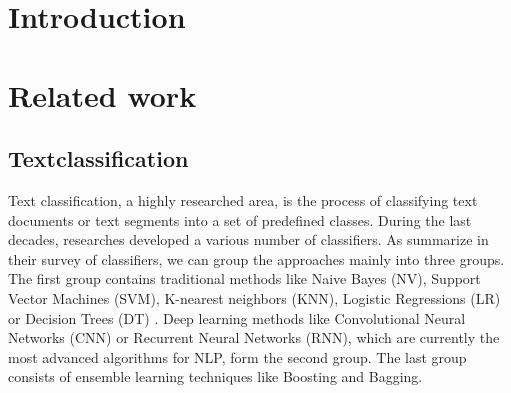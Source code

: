 \documentclass[12pt, a4paper, titlepage]{article}
\begin{document}
\section{Introduction}
\section{Related work}
\subsection{Textclassification}
Text classification, a highly researched area, is the process of classifying text documents or text segments into a set of predefined classes. During the last decades, researches developed a various number of classifiers. As \cite{Kowsari2019} summarize in their survey of classifiers, we can group the approaches mainly into three groups. The first group contains traditional methods like Naive Bayes (NV), Support Vector Machines (SVM), K-nearest neighbors (KNN),  Logistic Regressions (LR) or Decision Trees (DT) \citep{Vijayan2017, Colas2006, Kowsari2019, Sebastiani2001}. Deep learning methods like Convolutional Neural Networks (CNN) or Recurrent Neural Networks (RNN), which are currently the most advanced algorithms for NLP, form the second group. The last group consists of ensemble learning techniques like Boosting and Bagging.
\end{document}
